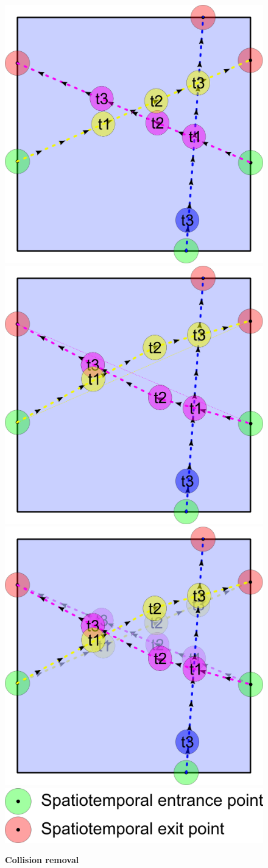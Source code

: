 \begin{figure}[t]
	\begin{center}
	\includegraphics[width=0.3\linewidth]{./images/collision-2D-example-with-collision.png}
	\includegraphics[width=0.3\linewidth]{./images/collision-2D-example-without-collision.png}
	\includegraphics[width=0.3\linewidth]{./images/collision-2D-example-overlay.png}
	\\
	\includegraphics[width=0.3\linewidth]{./images/key-entry-exit-point.png}
	\caption{
		\textbf{\textbf{Collision removal}}
	}
	\label{fig:collision-removal}
	\end{center}
\end{figure}

